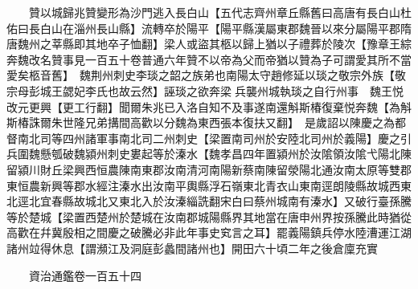　　贊以城歸兆贊變形為沙門逃入長白山【五代志齊州章丘縣舊曰高唐有長白山杜佑曰長白山在淄州長山縣】流轉卒於陽平【陽平縣漢屬東郡魏晉以來分屬陽平郡隋唐魏州之莘縣即其地卒子恤翻】梁人或盜其柩以歸上猶以子禮葬於陵次【豫章王綜奔魏改名贊事見一百五十卷普通六年贊不以帝為父而帝猶以贊為子可謂愛其所不當愛矣柩音舊】　魏荆州刺史李琰之韶之族弟也南陽太守趙修延以琰之敬宗外族【敬宗母彭城王勰妃李氏也故云然】誣琰之欲奔梁兵襲州城執琰之自行州事　魏王悦改元更興【更工行翻】聞爾朱兆已入洛自知不及事遂南還斛斯椿復棄悦奔魏【為斛斯椿誅爾朱世隆兄弟搆間高歡以分魏為東西張本復扶又翻】　是歲詔以陳慶之為都督南北司等四州諸軍事南北司二州刺史【梁置南司州於安陸北司州於義陽】慶之引兵圍魏懸瓠破魏潁州刺史婁起等於溱水【魏孝昌四年置潁州於汝隂領汝隂弋陽北陳留潁川財丘梁興西恒農陳南東郡汝南清河南陽新蔡南陳留滎陽北通汝南太原等雙郡東恒農新興等郡水經注溱水出汝南平輿縣浮石嶺東北青衣山東南逕朗陵縣故城西東北逕北宜春縣故城北又東北入於汝溱緇詵翻宋白曰蔡州城南有溱水】又破行臺孫騰等於楚城【梁置西楚州於楚城在汝南郡城陽縣界其地當在唐申州界按孫騰此時猶從高歡在幷冀殷相之間慶之破騰必非此年事史䆒言之耳】罷義陽鎮兵停水陸漕運江湖諸州竝得休息【謂瀕江及洞庭彭蠡間諸州也】開田六十頃二年之後倉廩充實

　　資治通鑑卷一百五十四  
    


 


 



 

 
  







 


　　
　　
　
　
　


　　

　















	
	









































